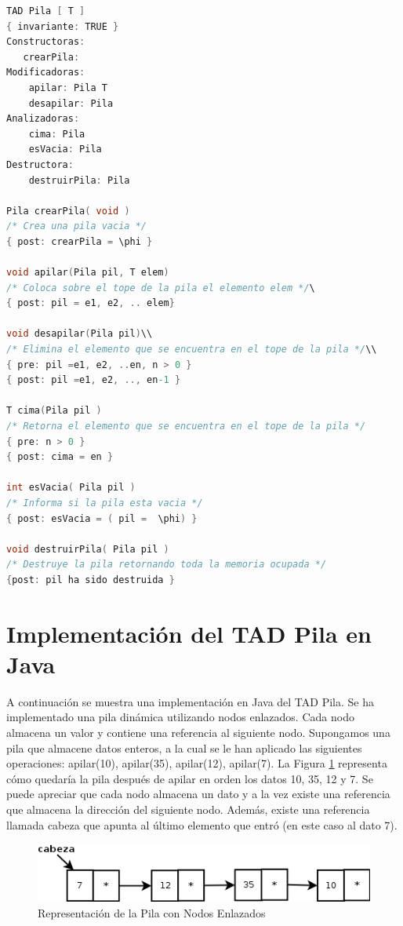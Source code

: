 \begin{lstlisting}[numbers=none, language=C]
TAD Pila [ T ]
{ invariante: TRUE }
Constructoras:
   crearPila: 
Modificadoras:
	apilar: Pila T 
	desapilar: Pila
Analizadoras:
	cima: Pila 
	esVacia: Pila
Destructora:
	destruirPila: Pila

Pila crearPila( void )
/* Crea una pila vacia */
{ post: crearPila = \phi }

void apilar(Pila pil, T elem)
/* Coloca sobre el tope de la pila el elemento elem */\
{ post: pil = e1, e2, .. elem}

void desapilar(Pila pil)\\
/* Elimina el elemento que se encuentra en el tope de la pila */\\
{ pre: pil =e1, e2, ..en, n > 0 }
{ post: pil =e1, e2, .., en-1 }

T cima(Pila pil )
/* Retorna el elemento que se encuentra en el tope de la pila */
{ pre: n > 0 }
{ post: cima = en }

int esVacia( Pila pil )
/* Informa si la pila esta vacia */
{ post: esVacia = ( pil =  \phi) }

void destruirPila( Pila pil )
/* Destruye la pila retornando toda la memoria ocupada */
{post: pil ha sido destruida }
\end{lstlisting}

\section{Implementación del TAD Pila en Java}
A continuación se muestra una implementación en Java del TAD Pila. Se ha implementado una pila dinámica utilizando nodos enlazados.  Cada nodo almacena un valor y contiene una referencia al siguiente nodo. Supongamos una pila que almacene datos enteros, a la cual se le han aplicado las siguientes operaciones: apilar(10), apilar(35), apilar(12), apilar(7). La Figura \ref{fig:pila-nodos-enlazados} representa cómo quedaría la pila después de apilar en orden los datos 10, 35, 12 y 7. Se puede apreciar que cada nodo almacena un dato y a la vez existe una referencia que almacena la dirección del siguiente nodo. Además, existe una referencia llamada cabeza que apunta al último elemento que entró (en este caso al dato 7).

\begin{figure}
	\centering
	\includegraphics[scale=0.7]{Diagramas/RepresentacionPilaNodosEnlazados}
	\caption{Representación de la Pila con Nodos Enlazados}	
	\label{fig:pila-nodos-enlazados}
\end{figure}

